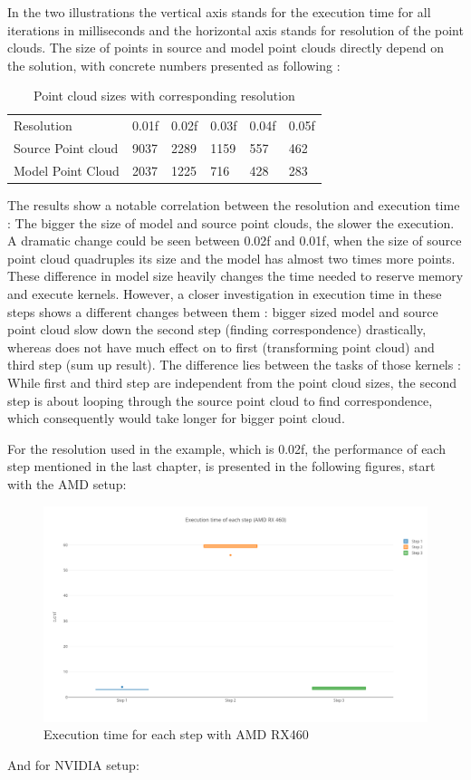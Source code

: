 In the two illustrations the vertical axis stands for the execution time for all iterations in milliseconds and the horizontal axis stands for resolution of the point clouds. The size of points in source and model point clouds directly depend on the solution, with concrete numbers presented as following :



\begin{table}[H]
\centering
\caption{Point cloud sizes with corresponding resolution}
\label{my-label}
\begin{tabular}{llllll}
Resolution         & 0.01f & 0.02f & 0.03f & 0.04f & 0.05f \\
Source Point cloud & 9037  & 2289  & 1159  & 557   & 462   \\
Model Point Cloud  & 2037  & 1225  & 716   & 428   & 283  
\end{tabular}
\end{table}
\newpage
The results show a notable correlation between the resolution and execution time :  The bigger the size of model and source point clouds, the slower the execution. A dramatic change could be seen between 0.02f and 0.01f, when the size of source point cloud quadruples its size and the model has almost two times more points. These difference in model size heavily changes the time needed to reserve memory and execute kernels. However, a closer investigation in execution time in these steps shows a different changes between them : bigger sized model and source point cloud slow down the second step (finding correspondence) drastically, whereas does not have much effect on to first (transforming point cloud) and third step (sum up result). The difference lies between the tasks of those kernels : While first and third step are independent from the point cloud sizes, the second step is about looping through the source point cloud to find correspondence, which consequently would take longer for bigger point cloud. 

For the resolution used in the example, which is 0.02f, the performance of each step mentioned in the last chapter, is presented in the following figures, start with the AMD setup:

\begin{figure}[H]
	\centering
	\includegraphics[width=14cm]{images/EachstepAMD.png}
	\caption{Execution time for each step with AMD RX460}
	\label{ExampleOCTImage}
\end{figure}
\newpage
And for NVIDIA setup:

